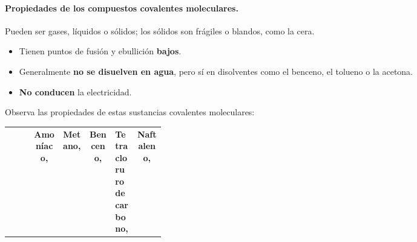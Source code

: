 \paragraph{Propiedades de los compuestos covalentes moleculares.} Pueden ser gases, líquidos o sólidos; los sólidos son frágiles o blandos, como la cera.
\begin{itemize}
    \item Tienen puntos de fusión y ebullición \textbf{bajos}.
    \item Generalmente \textbf{no se disuelven en agua}, pero sí en disolventes como el benceno, el tolueno o la acetona.
    \item \textbf{No conducen} la electricidad.
\end{itemize}

\begin{exercise}
    Observa las propiedades de estas sustancias covalentes moleculares:
    \begin{center}
        {\small
        \begin{tabular}{@{}L{0.16\linewidth} c c c C{0.14\linewidth} c@{}}
            \toprule
             & \textbf{Amoníaco, } & \textbf{Metano, } & \textbf{Benceno, } & \textbf{Tetracloruro de carbono, } & \textbf{Naftaleno, } \\

\end{tabular}}
\end{center}
\end{exercise}
